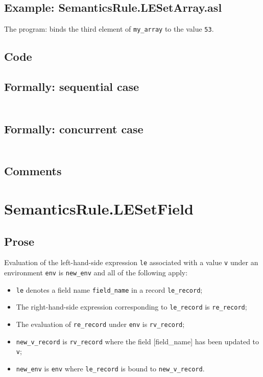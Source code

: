 \documentclass{book}
\begin{document}
    \subsection{Example: SemanticsRule.LESetArray.asl}
    The program:
    binds the third element of \texttt{my\_array} to the value \texttt{53}.

  \subsection{Code}

  \subsection{Formally: sequential case}
  \begin{align}
  \end{align} 

  \subsection{Formally: concurrent case}
  \begin{align}
  \end{align} 

    \subsection{Comments}

\section{SemanticsRule.LESetField \label{sec:SemanticsRule.LESetField}}

    \subsection{Prose}
    Evaluation of the left-hand-side expression \texttt{le} associated with a
value \texttt{v} under an environment \texttt{env} is \texttt{new\_env} and all
of the following apply:
    \begin{itemize}
    \item \texttt{le} denotes a field name \texttt{field\_name} in a record \texttt{le\_record};
    \item The right-hand-side expression corresponding to \texttt{le\_record} is
      \texttt{re\_record};
    \item The evaluation of \texttt{re\_record} under \texttt{env} is \texttt{rv\_record};
    \item \texttt{new\_v\_record} is \texttt{rv\_record} where the field [field\_name] has been
      updated to \texttt{v};
    \item \texttt{new\_env} is \texttt{env} where \texttt{le\_record} is bound to
      \texttt{new\_v\_record}.
    \end{itemize}
\end{document}

